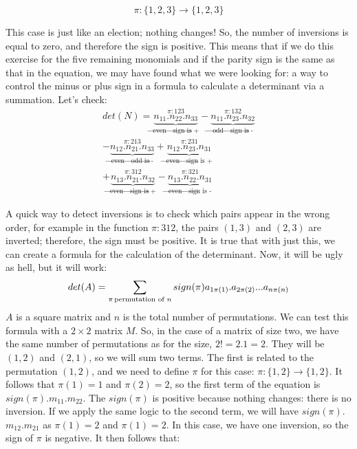 \documentclass[600paper, 11pt,twoside,openany]{kdp}
\begin{document}
\[\pi:\lbrace 1,2,3 \rbrace \rightarrow \lbrace 1,2,3 \rbrace\] 
\par 
\vspace{-3pt}
\indent This case is just like an election; nothing changes! So, the number of inversions is equal to zero, and therefore the sign is positive. This means that if we do this exercise for the five remaining monomials and if the parity sign is the same as that in the equation, we may have found what we were looking for: a way to control the minus or plus sign in a formula to calculate a determinant via a summation. Let’s check:
\begin{equation}\label{eq:polDet}
\begin{split}
det(N) = \underbrace{n_{11}.n_{22}.n_{33}}_{\text{even} \rightarrow \text{sign is +}}^{\pi:123} - \underbrace{n_{11}.n_{23}.n_{32}}_{\text{odd} \rightarrow \text{sign is -}}^{\pi:132} \\
 - \underbrace{ n_{12}.n_{21}.n_{33}}_{\text{even} \rightarrow \text{odd is -}}^{\pi:213} +  \underbrace{n_{12}.n_{23}.n_{31}}_{\text{even} \rightarrow \text{sign is +} }^{\pi:231} \\
  +  \underbrace{n_{13}.n_{21}.n_{32}}_{\text{even} \rightarrow \text{sign is +} }^{\pi:312} -  \underbrace{n_{13}.n_{22}.n_{31}}_{\text{even} \rightarrow \text{sign is -}}^{\pi:321}
\end{split}
\end{equation}
\par 
\vspace{-3pt}
\indent A quick way to detect inversions is to check which pairs appear in the wrong order, for example in the function $\pi:312$, the pairs $(1,3)$ and $(2,3)$ are inverted; therefore, the sign must be positive. It is true that with just this, we can create a formula for the calculation of the determinant. Now, it will be ugly as hell, but it will work: 
\begin{equation}\label{eq:detsign}
det(A) = \sum_{\pi \text{\hspace{0.5 mm}permutation of } n} sign(\pi) a_{1\pi(1)}.a_{2\pi(2)}...a_{n\pi(n)}
\end{equation}
\indent $A$ is a square matrix and $n$ is the total number of permutations. We can test this formula with a $2 \times 2$ matrix $M$. So, in the case of a matrix of size two, we have the same number of permutations as for the size, $2!=2.1=2$. They will be $(1,2)$ and $(2,1)$, so we will sum two terms. The first is related to the permutation $(1,2)$, and we need to define $\pi$ for this case: $\pi:\lbrace 1,2 \rbrace \rightarrow \lbrace 1,2 \rbrace$. It follows that $\pi(1) = 1$ and $\pi(2) = 2$, so the first term of the equation is $sign(\pi)$.$m_{11}$.$m_{22}$. The $sign(\pi)$ is positive because nothing changes: there is no inversion. If we apply the same logic to the second term, we will have $sign(\pi)$.$m_{12}$.$m_{21}$ as $\pi(1) = 2$ and $\pi(1) = 2$. In this case, we have one inversion, so the sign of $\pi$ is negative. It then follows that:
\end{document}
